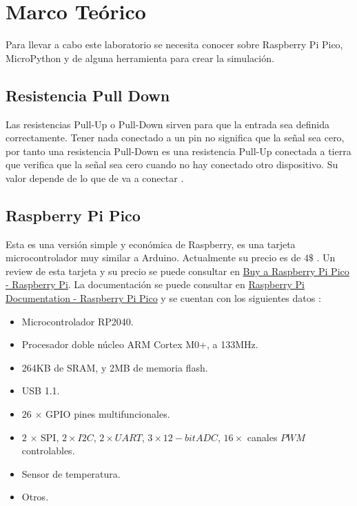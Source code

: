 \documentclass{article}
\begin{document}
    \section{Marco Teórico}\label{sec:marco-teórico}


    Para llevar a cabo este laboratorio se necesita conocer sobre Raspberry
    Pi Pico, MicroPython y de alguna herramienta para crear la simulación.

    \subsection{Resistencia Pull Down}

    Las resistencias Pull-Up o Pull-Down sirven para que la entrada sea
    definida correctamente. Tener nada conectado a un pin no significa que la
    señal sea cero, por tanto una resistencia Pull-Down es una resistencia
    Pull-Up conectada a tierra que verifica que la señal sea cero cuando no
    hay conectado otro dispositivo. Su valor depende de lo que de va a
    conectar \cite{arduino-2018}.

    \subsection{Raspberry Pi Pico}

    Esta es una versión simple y económica de Raspberry, es una tarjeta
    microcontrolador muy similar a Arduino. Actualmente su precio es de $4\$$
    . Un review de esta tarjeta y su precio se puede consultar en
    \href{https://www.raspberrypi.com/products/raspberry-pi-pico}{Buy a
    Raspberry Pi Pico - Raspberry Pi}. La documentación se puede consultar en
    \href{https://www.raspberrypi.com/documentation/microcontrollers/raspberry-pi-pico.html}{Raspberry Pi
    Documentation - Raspberry Pi Pico} y se cuentan con los siguientes datos
    \cite{raspberry-pi-ltd-2022}:

    \begin{itemize}
        \item Microcontrolador RP2040.
        \item Procesador doble núcleo ARM Cortex M0+, a 133MHz.
        \item 264KB de SRAM, y 2MB de memoria flash.
        \item USB 1.1.
        \item $26$ $\times$ GPIO pines multifuncionales.
        \item $2$ $\times$ SPI, $2 \times I2C$, $2 \times UART$, $3 \times
        12-bit ADC$, $16 \times $ canales $PWM$ controlables.
        \item Sensor de temperatura.
        \item Otros.
    \end{itemize}
\end{document}
